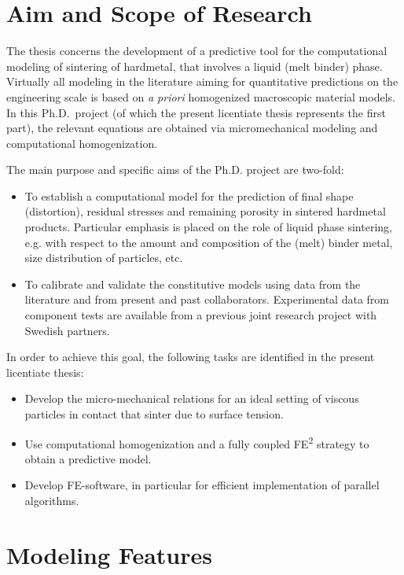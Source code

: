 \documentclass[ExampleMasters.tex]{subfiles}
\begin{document}
\chapter{Aim and Scope of Research}

The thesis concerns the development of a predictive tool for the computational modeling of sintering of hardmetal, that involves a liquid (melt binder) phase.
Virtually all modeling in the literature aiming for quantitative predictions on the engineering scale is based on \emph{a priori} homogenized macroscopic material models.
In this Ph.D.\ project (of which the present licentiate thesis represents the first part), the relevant equations are obtained via micromechanical modeling and computational homogenization.

The main purpose and specific aims of the Ph.D. project are two-fold:
\begin{itemize}
\item To establish a computational model for the prediction of final shape (distortion), residual stresses and remaining porosity in sintered hardmetal products.
Particular emphasis is placed on the role of liquid phase sintering, e.g. with respect to the amount and composition of the (melt) binder metal, size distribution of particles, etc.

\item To calibrate and validate the constitutive models using data from the literature and from present and past collaborators.
Experimental data from component tests are available from a previous joint research project with Swedish partners.
\end{itemize}
In order to achieve this goal, the following tasks are identified in the present licentiate thesis:
\begin{itemize}
 \item Develop the micro-mechanical relations for an ideal setting of viscous particles in contact that sinter due to surface tension.
 \item Use computational homogenization and a fully coupled FE\textsuperscript{2} strategy to obtain a predictive model.
 \item Develop FE-software, in particular for efficient implementation of parallel algorithms.
\end{itemize}

\chapter{Modeling Features}
\end{document}
